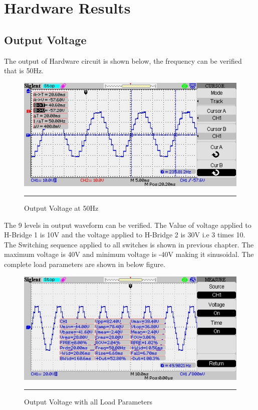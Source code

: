 
\chapter{Hardware Results} %
\label{Chapter6}
\section{Output Voltage}
The output of Hardware circuit is shown below, the frequency can be verified that is 50Hz.
\begin{figure}[htbp]
	\centering
	\includegraphics[width = 6in]{./Figures/Photos/Hardware/2}
	\rule{35em}{1pt}
	\caption{Output Voltage at 50Hz}
\end{figure}

The 9 levels in output waveform can be verified. The Value of voltage applied to H-Bridge 1 is 10V and the voltage applied to H-Bridge 2 is 30V i.e 3 times 10. The Switching sequence applied to all switches is shown in previous chapter. The maximum voltage is 40V and minimum voltage is -40V making it sinusoidal. The complete load parameters are shown in below figure.

\begin{figure}[htbp]
	\centering
	\includegraphics[width = 6in]{./Figures/Photos/Hardware/15}
	\rule{35em}{1pt}
	\caption{Output Voltage with all Load Parameters}
\end{figure}
\newpage
